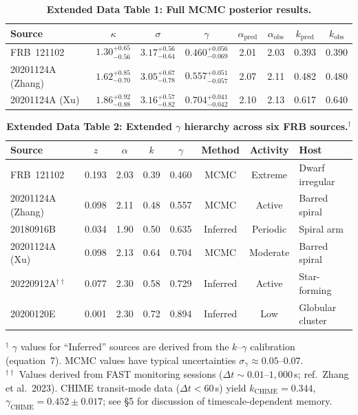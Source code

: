 
\begin{table}[!ht]
\centering
\caption{\textbf{Extended Data Table 1: Full MCMC posterior results.}}
\begin{tabular}{lccccccc}
\toprule
\textbf{Source} & $\kappa$ & $\sigma$ & $\gamma$ & $\alpha_{\mathrm{pred}}$ & $\alpha_{\mathrm{obs}}$ & $k_{\mathrm{pred}}$ & $k_{\mathrm{obs}}$ \\
\midrule
FRB~121102            & $1.30^{+0.65}_{-0.56}$ & $3.17^{+0.56}_{-0.64}$ & $0.460^{+0.056}_{-0.069}$ & 2.01 & 2.03 & 0.393 & 0.390 \\
20201124A (Zhang)     & $1.62^{+0.85}_{-0.70}$ & $3.05^{+0.67}_{-0.78}$ & $0.557^{+0.051}_{-0.057}$ & 2.07 & 2.11 & 0.482 & 0.480 \\
20201124A (Xu)        & $1.86^{+0.92}_{-0.88}$ & $3.16^{+0.57}_{-0.82}$ & $0.704^{+0.041}_{-0.042}$ & 2.10 & 2.13 & 0.617 & 0.640 \\
\bottomrule
\end{tabular}
\label{tab:ed1}
\end{table}

\begin{table}[!ht]
\centering
\caption{\textbf{Extended Data Table 2: Extended $\gamma$ hierarchy across six FRB sources.}$^{\dagger}$}
\begin{tabular}{lccccccl}
\toprule
\textbf{Source} & $z$ & $\alpha$ & $k$ & $\gamma$ & Method & Activity & Host \\
\midrule
FRB~121102         & 0.193 & 2.03 & 0.39 & 0.460 & MCMC     & Extreme    & Dwarf irregular \\
20201124A (Zhang)  & 0.098 & 2.11 & 0.48 & 0.557 & MCMC     & Active     & Barred spiral \\
20180916B          & 0.034 & 1.90 & 0.50 & 0.635 & Inferred & Periodic   & Spiral arm \\
20201124A (Xu)     & 0.098 & 2.13 & 0.64 & 0.704 & MCMC     & Moderate   & Barred spiral \\
20220912A$^{\dagger\dagger}$  & 0.077 & 2.30 & 0.58 & 0.729 & Inferred & Active     & Star-forming \\
20200120E          & 0.001 & 2.30 & 0.72 & 0.894 & Inferred & Low        & Globular cluster \\
\bottomrule
\end{tabular}
\begin{flushleft}
{\footnotesize $^{\dagger}$ $\gamma$ values for ``Inferred'' sources are derived from the $k$--$\gamma$ calibration (equation~7). MCMC values have typical uncertainties $\sigma_\gamma \approx 0.05$--$0.07$.}\\
{\footnotesize $^{\dagger\dagger}$ Values derived from FAST monitoring sessions ($\Delta t \sim 0.01$--$1{,}000$\,s; ref.~Zhang et al.~2023). CHIME transit-mode data ($\Delta t < 60$\,s) yield $k_{\mathrm{CHIME}} = 0.344$, $\gamma_{\mathrm{CHIME}} = 0.452 \pm 0.017$; see \S5 for discussion of timescale-dependent memory.}
\end{flushleft}
\label{tab:ed2}
\end{table}
